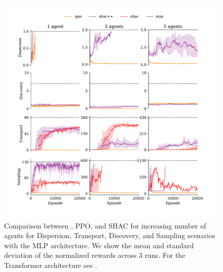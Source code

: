 \begin{figure}[t]
    \centering
    \includegraphics[width=\columnwidth]{figs/main-mlp.pdf}
    \caption{Comparison between \fname{}, PPO, and SHAC for increasing number of agents for Dispersion, Transport, Discovery, and Sampling scenarios with the MLP architecture.
    We show the mean and standard deviation of the normalized rewards across $3$ runs. For the Transformer architecture see .
    }
    \label{apx:fig:experiments-mlp}
\end{figure}

